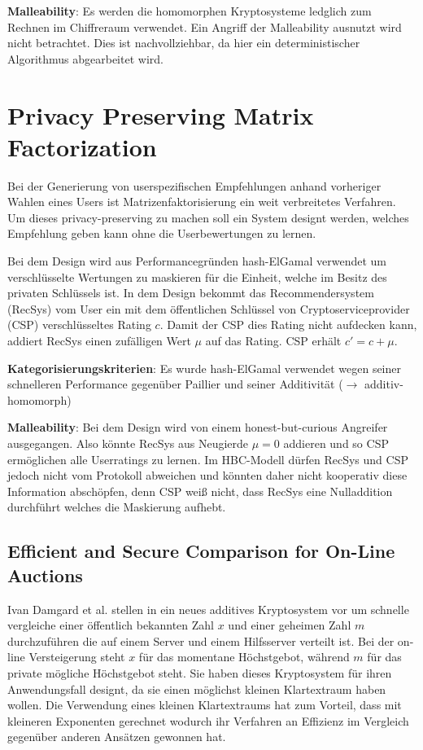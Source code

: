 \textbf{Malleability}: Es werden die homomorphen Kryptosysteme ledglich zum Rechnen im Chiffreraum verwendet. Ein Angriff der Malleability ausnutzt wird nicht betrachtet. Dies ist nachvollziehbar, da hier ein deterministischer Algorithmus abgearbeitet wird.

\section{Privacy Preserving Matrix Factorization} \cite{nikolaenko2013privacy}
Bei der Generierung von userspezifischen Empfehlungen anhand vorheriger Wahlen eines Users ist Matrizenfaktorisierung ein weit verbreitetes Verfahren. Um dieses privacy-preserving zu machen soll ein System designt werden, welches Empfehlung geben kann ohne die Userbewertungen zu lernen.

Bei dem Design wird aus Performancegründen hash-ElGamal verwendet um verschlüsselte Wertungen zu maskieren für die Einheit, welche im Besitz des privaten Schlüssels ist. In dem Design bekommt das Recommendersystem (RecSys) vom User ein mit dem öffentlichen Schlüssel von Cryptoserviceprovider (CSP) verschlüsseltes Rating $c$. Damit der CSP dies Rating nicht aufdecken kann, addiert RecSys einen zufälligen Wert $\mu$ auf das Rating. CSP erhält $c'=c+\mu$.

\textbf{Kategorisierungskriterien}: Es wurde hash-ElGamal verwendet wegen seiner schnelleren Performance gegenüber Paillier und seiner Additivität ($\rightarrow$ additiv-homomorph)

\textbf{Malleability}: Bei dem Design wird von einem honest-but-curious Angreifer ausgegangen. Also könnte RecSys aus Neugierde $\mu=0$ addieren und so CSP ermöglichen alle Userratings zu lernen. Im HBC-Modell dürfen RecSys und CSP jedoch nicht vom Protokoll abweichen und könnten daher nicht kooperativ diese Information abschöpfen, denn CSP weiß nicht, dass RecSys eine Nulladdition durchführt welches die Maskierung aufhebt.

\subsection{Efficient and Secure Comparison for On-Line Auctions}
Ivan Damgard et al. stellen in \cite{damgaard2007efficient} ein neues additives Kryptosystem vor um schnelle vergleiche einer öffentlich bekannten Zahl $x$ und einer geheimen Zahl $m$ durchzuführen die auf einem Server und einem Hilfsserver verteilt ist. Bei der on-line Versteigerung steht $x$ für das momentane Höchstgebot, während $m$ für das private mögliche Höchstgebot steht. Sie haben dieses Kryptosystem für ihren Anwendungsfall designt, da sie einen möglichst kleinen Klartextraum haben wollen. Die Verwendung eines kleinen Klartextraums hat zum Vorteil, dass mit kleineren Exponenten gerechnet wodurch ihr Verfahren an Effizienz im Vergleich gegenüber anderen Ansätzen gewonnen hat. 

